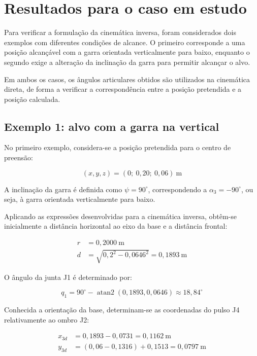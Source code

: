 
\section{Resultados para o caso em estudo}
\label{sec:ik_resultados}

Para verificar a formulação da cinemática inversa, foram considerados dois exemplos com diferentes condições de alcance. O primeiro corresponde a uma posição alcançável com a garra orientada verticalmente para baixo, enquanto o segundo exige a alteração da inclinação da garra para permitir alcançar o alvo.

Em ambos os casos, os ângulos articulares obtidos são utilizados na cinemática direta, de forma a verificar a correspondência entre a posição pretendida e a posição calculada.

\subsection{Exemplo 1: alvo com a garra na vertical}

No primeiro exemplo, considera-se a posição pretendida para o centro de preensão:

\begin{equation}
    (x,y,z)=(0;\ 0{,}20;\ 0{,}06)\ \text{m}
\end{equation}

A inclinação da garra é definida como $\psi=90^\circ$, correspondendo a $\alpha_3=-90^\circ$, ou seja, à garra orientada verticalmente para baixo.

Aplicando as expressões desenvolvidas para a cinemática inversa, obtêm-se inicialmente a distância horizontal ao eixo da base e a distância frontal:

\begin{align*}
    r &= 0{,}2000\ \text{m}\\
    d &= \sqrt{0{,}2^2-0{,}0646^2}
    =0{,}1893\ \text{m}
\end{align*}

O ângulo da junta J1 é determinado por:

\begin{equation}
    q_1=90^\circ-
    \operatorname{atan2}(0{,}1893,0{,}0646)
    \approx18{,}84^\circ
\end{equation}

Conhecida a orientação da base, determinam-se as coordenadas do pulso J4 relativamente ao ombro J2:

\begin{align*}
    x_{3d} &= 0{,}1893-0{,}0731
    =0{,}1162\ \text{m}\\
    y_{3d} &= (0{,}06-0{,}1316)+0{,}1513
    =0{,}0797\ \text{m}
\end{align*}

